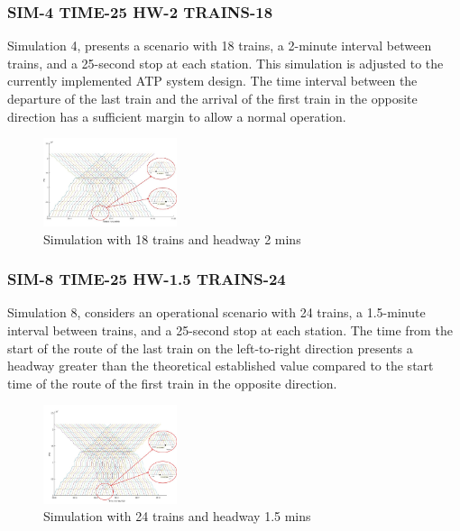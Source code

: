 \documentclass[conference]{IEEEtran}
\begin{document}
\subsubsection{SIM-4 TIME-25 HW-2 TRAINS-18}
Simulation 4, presents a scenario with 18 trains\cite{b20}, a 2-minute interval between trains\cite{b20}, and a 25-second stop at each station\cite{b15}. This simulation is adjusted to the currently implemented ATP system design. The time interval between the departure of the last train and the arrival of the first train in the opposite direction has a sufficient margin to allow a normal operation.\\
\begin{figure}[h]
    \centering
    \includegraphics[width=0.35\textwidth,scale=1]{Imagenes_general/SIM-4_TIME-25_HW-2_TRAINS-18.jpg}
    \caption{Simulation with 18 trains and headway 2 mins}
    \label{fig:Simulation 4: 18 Trains / 2 mins headway}
\end{figure}

\subsubsection{SIM-8 TIME-25 HW-1.5 TRAINS-24}
Simulation 8, considers an operational scenario with 24 trains, a 1.5-minute interval between trains, and a 25-second stop at each station\cite{b15}. The time from the start of the route of the last train on the left-to-right direction presents a headway greater than the theoretical established value compared to the start time of the route of the first train in the opposite direction.
\begin{figure}[h]
    \centering
    \includegraphics[width=0.35\textwidth,scale=1]{Imagenes_general/SIM-8_TIME-25_HW-1_5_TRAINS-24.jpg}
    \caption{Simulation with 24 trains and headway 1.5 mins}
    \label{fig:Simulation 8: 25 Trains / 1,5 mins headway}
\end{figure}
\end{document}
